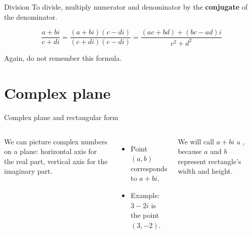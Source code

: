 \begin{frame}{Division}
To divide, multiply numerator and denominator by the \textbf{conjugate} of the denominator.
\begin{thm}{}{}
\begin{equation}
\frac{a+bi}{c+di} = \frac{(a+bi)(c-di)}{(c+di)(c-di)} = \frac{(ac+bd) + (bc-ad)i}{c^2+d^2}
\end{equation}
\end{thm}
Again, do not remember this formula.
\end{frame}

\section{Complex plane}
\frame{\sectionpage}

\begin{frame}{Complex plane and rectangular form}
  \begin{columns}
      We can picture complex numbers on a plane: horizontal axis for the real part, vertical axis for the imaginary part.
      \begin{itemize}
        \item Point $(a,b)$ corresponds to $a+bi$.
        \item Example: $3-2i$ is the point $(3,-2)$.
      \end{itemize}
     We will call $a+bi$ a , because $a$ and $b$ represent rectangle's width and height.
      \begin{center}
      \end{center}
    \end{columns}
\end{frame}

